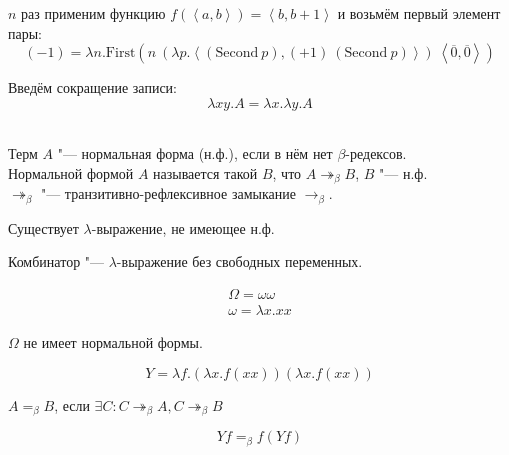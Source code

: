 $n$ раз применим функцию $f\left(\left<a,b\right>\right) = \left<b,b+1\right>$ и возьмём первый элемент пары:
\[
    (-1) = \lambda n . \mathrm{First} \left(n\ (\lambda p . \left<\left(\mathrm{Second}\ p\right), (+1)\ (\mathrm{Second}\ p)\right>)\
    \left<\overline{0},\overline{0}\right>\right)
\]

Введём сокращение записи:
\[
    \lambda x y . A = \lambda x . \lambda y . A
\]

\begin{definition} \mbox{} \\
    Терм $A$ "--- нормальная форма (н.ф.), если в нём нет $\beta$-редексов. \\
    Нормальной формой $A$ называется такой $B$, что $A \twoheadrightarrow_{\beta} B$, $B$ "--- н.ф. \\
    $\twoheadrightarrow_{\beta}$ "--- транзитивно-рефлексивное замыкание $\rightarrow_{\beta}$.
\end{definition}

\begin{statement}
    Существует $\lambda$-выражение, не имеющее н.ф.
\end{statement}

\begin{definition}[Комбинатор]
    Комбинатор "--- $\lambda$-выражение без свободных переменных.
\end{definition}

\begin{definition}
    \begin{gather*}
        \Omega = \omega \omega \\
        \omega = \lambda x . x x
    \end{gather*}
\end{definition}

$\Omega$ не имеет нормальной формы.

\begin{definition}
    \[
        Y = \lambda f . (\lambda x . f (x x)) (\lambda x . f (x x))
    \]
\end{definition}

\begin{definition}
    $A=_{\beta}B$, если $\exists C : C \twoheadrightarrow_{\beta} A, C \twoheadrightarrow_{\beta}B$
\end{definition}

\begin{statement}
    \[
        Yf =_{\beta} f(Yf)
    \]
\end{statement}

